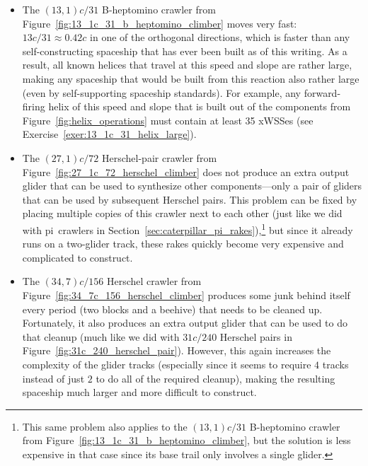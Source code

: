 \begin{itemize}
	\item The $(13,1)c/31$ B-heptomino crawler from Figure~\ref{fig:13_1c_31_b_heptomino_climber} moves very fast: $13c/31 \approx 0.42c$ in one of the orthogonal directions, which is faster than any self-constructing spaceship that has ever been built as of this writing. As a result, all known helices that travel at this speed and slope are rather large, making any spaceship that would be built from this reaction also rather large (even by self-supporting spaceship standards). For example, any forward-firing helix of this speed and slope that is built out of the components from Figure~\ref{fig:helix_operations} must contain at least 35 xWSSes (see Exercise~\ref{exer:13_1c_31_helix_large}).\smallskip
	
	\item The $(27,1)c/72$ Herschel-pair crawler from Figure~\ref{fig:27_1c_72_herschel_climber} does not produce an extra output glider that can be used to synthesize other components---only a pair of gliders that can be used by subsequent Herschel pairs. This problem can be fixed by placing multiple copies of this crawler next to each other (just like we did with pi~crawlers in Section~\ref{sec:caterpillar_pi_rakes}),\footnote{This same problem also applies to the $(13,1)c/31$ B-heptomino crawler from Figure~\ref{fig:13_1c_31_b_heptomino_climber}, but the solution is less expensive in that case since its base trail only involves a single glider.} but since it already runs on a two-glider track, these rakes quickly become very expensive and complicated to construct.\smallskip
	
	\item The $(34,7)c/156$ Herschel crawler from Figure~\ref{fig:34_7c_156_herschel_climber} produces some junk behind itself every period (two blocks and a beehive) that needs to be cleaned up. Fortunately, it also produces an extra output glider that can be used to do that cleanup (much like we did with $31c/240$ Herschel pairs in Figure~\ref{fig:31c_240_herschel_pair}). However, this again increases the complexity of the glider tracks (especially since it seems to require $4$ tracks instead of just $2$ to do all of the required cleanup), making the resulting spaceship much larger and more difficult to construct.
\end{itemize}


